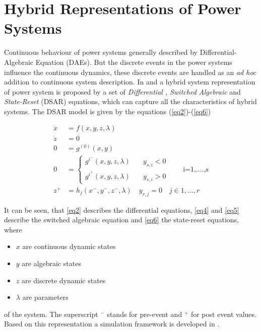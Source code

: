 \documentclass{article}	%
\author{Mohammed Ahsan Adib Murad, ID: 16203295}
\title{}
\date{\parbox{\linewidth}{\centering%
  \today\endgraf\bigskip\center
  \endgraf\medskip
   \endgraf
  University College Dublin}}
\begin{document}
\maketitle			%

\section{Hybrid Representations of Power Systems}

Continuous behaviour of power systems generally described by Differential-Algebraic Equation (DAEs). But the discrete events in the power systems influence the continuous dynamics, these discrete events are handled as an \textit{ad hoc} addition to continuous system description.
In \cite{H1} and \cite{H2} a hybrid system representation of power system is proposed by a set of \textit{Differential , Switched Algebraic} and \textit{State-Reset} (DSAR) equations, which can capture all the characteristics of hybrid systems. The DSAR model is given by the equations (\ref{eq2})-(\ref{eq6})

\begin{align}
\dot{x}                    & = f(x,y,z,\lambda) \label{eq2} \\
\dot{z}                    & = 0 \label{eq3}                \\
0                          & =g^{(0)}(x,y) \label{eq4}      \\
0                          & = \begin{cases}
    g^{i^-}(x,y,z,\lambda) & \quad y_{s,i} < 0              \\
    g^{i^+}(x,y,z,\lambda) & \quad y_{s,i} > 0
  \end{cases}
  \qquad \text{i=1,....,s} \label{eq5}                      \\
z^+                        & = h_j(x^-,y^-,z^-,\lambda) \quad y_{r,j}=0 \quad j\in {1,...,r} \label{eq6}
\end{align}

It can be seen, that \eqref{eq2} describes the differential equations, \eqref{eq4} and \eqref{eq5} describe the switched algebraic equation and \eqref{eq6} the state-reset equations, where
\begin{itemize}
\item $x$ are continuous dynamic states
\item $y$ are algebraic states
\item $z$ are discrete dynamic states
\item $\lambda$ are parameters
\end{itemize}
of the system. The superscript $^-$ stands for pre-event and $^+$ for post event values. Based on this representation a simulation framework is developed in \cite{turhum}.
\end{document}
